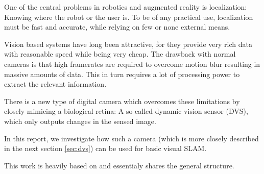 One of the central problems in robotics and augmented reality is localization:
Knowing where the robot or the user is. To be of any practical use,
localization must be fast and accurate, while relying on few or none external
means.

Vision based systems have long been attractive, for they provide very rich data
with reasonable speed while being very cheap. The drawback with normal cameras
is that high framerates are required to overcome motion blur resulting in
massive amounts of data. This in turn requires a lot of processing power to
extract the relevant information.

There is a new type of digital camera which overcomes these limitations by
closely mimicing a biological retina: A so called dynamic vision sensor (DVS),
which only outputs changes in the sensed image.

In this report, we investigate how such a camera (which is more closely
described in the next section \ref{sec:dvs}) can be used for basic visual SLAM.

This work is heavily based on \cite{kim2014simultaneous} and essentialy shares
the general structure.
